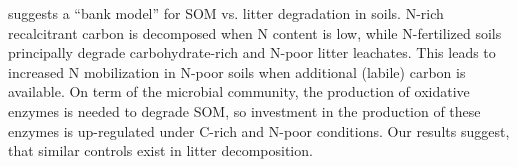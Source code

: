 
\cite{Fontaine2011} suggests a ``bank model'' for SOM vs. litter degradation in soils. N-rich recalcitrant carbon is decomposed when N content is low, while N-fertilized soils principally degrade carbohydrate-rich and N-poor litter leachates. This leads to increased N mobilization in N-poor soils when additional (labile) carbon is available. On term of the microbial community, the production of oxidative enzymes is needed to degrade SOM, so investment in the production of these enzymes is up-regulated under C-rich and N-poor conditions. Our results suggest, that similar controls exist in litter decomposition.


